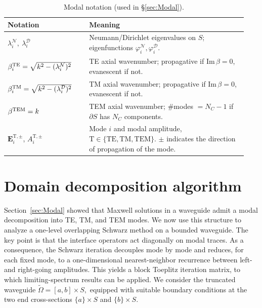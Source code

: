 \documentclass[smallextended]{svjour3}       %
\begin{document}
{\begin{table}[t]
\centering
\scriptsize
\setlength{\tabcolsep}{3pt}
\renewcommand{\arraystretch}{1.08}
\begin{tabular}{@{}p{0.32\linewidth}p{0.62\linewidth}@{}}
\hline
\textbf{Notation} & \textbf{Meaning} \\
\hline
$\lambda_i^{\mathcal N},\ \lambda_i^{\mathcal D}$ & Neumann/Dirichlet eigenvalues on $S$; eigenfunctions $\varphi_i^{\mathcal N},\varphi_i^{\mathcal D}$. \\
$\beta_i^{\rm TE}=\sqrt{k^2-(\lambda_i^{\mathcal N})^2}$ & TE axial wavenumber; propagative if $\mathrm{Im}\,\beta=0$, evanescent if not. \\
$\beta_i^{\rm TM}=\sqrt{k^2-(\lambda_i^{\mathcal D})^2}$ & TM axial wavenumber; propagative if $\mathrm{Im}\,\beta=0$, evanescent if not. \\
$\beta^{\rm TEM}=k$ & TEM axial wavenumber; \#modes $=N_C-1$ if $\partial S$ has $N_C$ components. \\
$\mathbf E_i^{\mathrm T,\pm}$, $A_i^{\mathrm T,\pm}$ & Mode $i$ and modal amplitude, $\mathrm T\in\{\mathrm{TE},\mathrm{TM},\mathrm{TEM}\}$. $\pm$ indicates the direction of propagation of the mode. \\
\hline
\end{tabular}
\caption{Modal notation (used in \S\ref{sec:Modal}).}
\label{tab:notation-modal}
\end{table}}

\section{Domain decomposition algorithm}
\label{sec:DD}

Section~\ref{sec:Modal} showed that Maxwell solutions in a waveguide admit a modal decomposition into TE, TM, and TEM modes. We now use this structure to analyze a one-level overlapping Schwarz method on a bounded waveguide. The key point is that the interface operators act diagonally on modal traces. As a consequence, the Schwarz iteration decouples mode by mode and reduces, for each fixed mode, to a one-dimensional nearest-neighbor recurrence between left- and right-going amplitudes. This yields a block Toeplitz iteration matrix, to which limiting-spectrum results can be applied.
We consider the truncated waveguide
\(
\widetilde\Omega=[a,b]\times S,
\)
equipped with suitable boundary conditions at the two end cross-sections $\{a\}\times S$ and $\{b\}\times S$.
\end{document}
